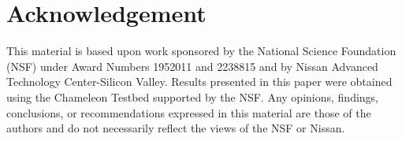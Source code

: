 \section{Acknowledgement}

This material is based upon work sponsored by the National Science Foundation (NSF) under Award Numbers 1952011 and 2238815 and by Nissan Advanced Technology Center-Silicon Valley. Results presented in this paper were obtained using the Chameleon Testbed supported by the NSF. Any opinions, findings, conclusions, or recommendations expressed in this material are those of the authors and do not necessarily reflect the views of the NSF or Nissan. 